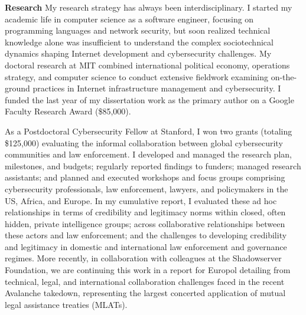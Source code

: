 \documentclass[11pt]{letter}
\begin{document}
\begin{letter}
\textbf{Research} \vspace{0.2 \baselineskip} \newline %
%
My research strategy has always been interdisciplinary. 
%
I started my academic life in computer science as a software engineer, focusing on programming languages and network security, but soon realized technical knowledge alone was insufficient to understand the complex sociotechnical dynamics shaping Internet development and cybersecurity challenges.
My doctoral research at MIT combined international political economy, operations strategy, and computer science to conduct extensive fieldwork examining on-the-ground practices in Internet infrastructure management and cybersecurity.
%
I funded the last year of my dissertation work as the primary author on a Google Faculty Research Award (\$85,000). 
%

As a Postdoctoral Cybersecurity Fellow at Stanford, I won two grants (totaling \$125,000) evaluating the informal collaboration between global  cybersecurity communities and law enforcement.
%
%
I developed and managed the research plan, milestones, and budgets; regularly reported findings to funders; managed research assistants; and planned and executed workshops and focus groups comprising cybersecurity professionals, law enforcement, lawyers, and policymakers in the US, Africa, and Europe.
%
In my cumulative report, I evaluated these ad hoc relationships in terms of credibility and legitimacy norms within closed, often hidden, private intelligence groups; across collaborative relationships between these actors and law enforcement; and the challenges to developing credibility and legitimacy in domestic and international law enforcement and governance regimes.  
%
More recently, in collaboration with colleagues at the Shadowserver Foundation, we are continuing this work in a report for Europol detailing from technical, legal, and international collaboration challenges faced in the recent Avalanche takedown, representing the largest concerted application of mutual legal assistance treaties (MLATs).



\end{letter}
\end{document}
